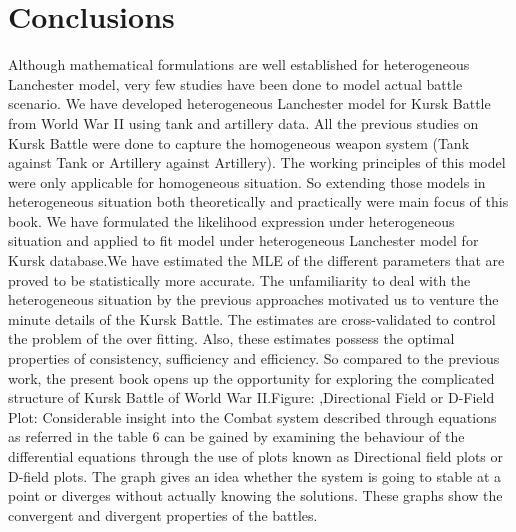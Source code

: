 \documentclass[]{article}
\begin{document}
\section{Conclusions}
Although mathematical formulations are well established for heterogeneous Lanchester model, very few studies have been done to model actual battle scenario. We have developed heterogeneous Lanchester model for Kursk Battle from World War II using tank and artillery data. All the previous studies on Kursk Battle were done to capture the homogeneous weapon system (Tank against Tank or Artillery against Artillery). The working principles of this model were only applicable for homogeneous situation. So extending those models in heterogeneous situation both theoretically and practically were main focus of this book. We have formulated the likelihood expression under heterogeneous situation and applied to fit model under heterogeneous Lanchester model for Kursk database.We have estimated the MLE of the different parameters that are proved to be statistically more accurate. The unfamiliarity to deal with the heterogeneous situation by the previous approaches motivated us to venture the minute details of the Kursk Battle. The estimates are cross-validated to control the problem of the over fitting. Also, these estimates possess the optimal properties of consistency, sufficiency and efficiency. So compared to the previous work, the present book opens up the opportunity for exploring the complicated structure of Kursk Battle of World War II.Figure: ,Directional Field or D-Field Plot: Considerable insight into the Combat system described through equations as referred in the table 6 can be gained by examining the behaviour of the differential equations through the use of plots known as Directional field plots or D-field plots. The graph gives  an idea whether the system is going to stable at a point or diverges without actually knowing the solutions. These graphs show the convergent and divergent properties of the battles.


\end{document}

